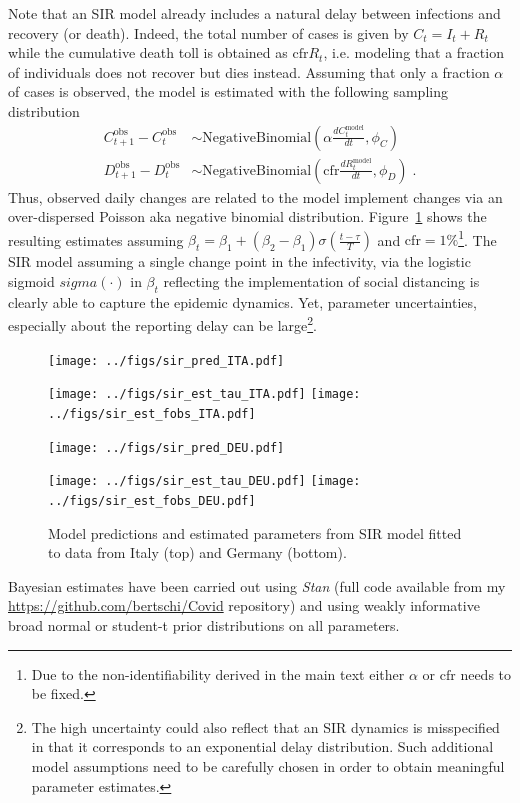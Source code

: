 \documentclass[fullpage,a4paper]{article}
\newcommand{\fig}[1]{Figure~\ref{fig:#1}}
\begin{document}
Note that an SIR model already includes a natural delay between
infections and recovery (or death). Indeed, the total number of cases
is given by $C_t = I_t + R_t$ while the cumulative death toll is
obtained as $\mathrm{cfr} R_t$, i.e. modeling that a fraction of
individuals does not recover but dies instead. Assuming that only a
fraction $\alpha$ of cases is observed, the model is estimated with
the following sampling distribution
\begin{align*}
  C^{\mathrm{obs}}_{t+1} - C^{\mathrm{obs}}_t &\sim \mathrm{NegativeBinomial}\left(\alpha \frac{dC^{\mathrm{model}}_t}{dt}, \phi_C \right) \\
  D^{\mathrm{obs}}_{t+1} - D^{\mathrm{obs}}_t &\sim \mathrm{NegativeBinomial}\left(\mathrm{cfr} \frac{dR^{\mathrm{model}}_t}{dt}, \phi_D \right) \; .
\end{align*}
Thus, observed daily changes are related to the model implement
changes via an over-dispersed Poisson aka negative binomial
distribution. \fig{sir_fit} shows the resulting estimates assuming
$\beta_t = \beta_1 + (\beta_2 - \beta_1) \sigma(\frac{t - \tau}{T})$
and $\mathrm{cfr} = 1\%$\footnote{Due to the non-identifiability
  derived in the main text either $\alpha$ or $\mathrm{cfr}$ needs to
  be fixed.}.  The SIR model assuming a single change point in the
infectivity, via the logistic sigmoid $sigma(\cdot)$ in $\beta_t$
reflecting the implementation of social distancing is clearly able to
capture the epidemic dynamics. Yet, parameter uncertainties,
especially about the reporting delay can be large\footnote{The high
  uncertainty could also reflect that an SIR dynamics is misspecified
  in that it corresponds to an exponential delay distribution. Such
  additional model assumptions need to be carefully chosen in order to
  obtain meaningful parameter estimates.}.
\begin{figure}
  \begin{minipage}{0.66\textwidth}
    \texttt{[image: ../figs/sir\_pred\_ITA.pdf]}      
  \end{minipage}
  \begin{minipage}{0.33\textwidth}
    \texttt{[image: ../figs/sir\_est\_tau\_ITA.pdf]}
    \texttt{[image: ../figs/sir\_est\_fobs\_ITA.pdf]}
  \end{minipage}
  \begin{minipage}{0.66\textwidth}
    \texttt{[image: ../figs/sir\_pred\_DEU.pdf]}      
  \end{minipage}
  \begin{minipage}{0.33\textwidth}
    \texttt{[image: ../figs/sir\_est\_tau\_DEU.pdf]}
    \texttt{[image: ../figs/sir\_est\_fobs\_DEU.pdf]}
  \end{minipage}
  \caption{\label{fig:sir_fit} Model predictions and estimated
    parameters from SIR model fitted to data from Italy (top) and
    Germany (bottom).}
\end{figure}

Bayesian estimates have been carried out using {\em Stan} (full code
available from my
\href{Github}{\url{https://github.com/bertschi/Covid}} repository) and
using weakly informative broad normal or student-t prior distributions
on all parameters.
\end{document}

